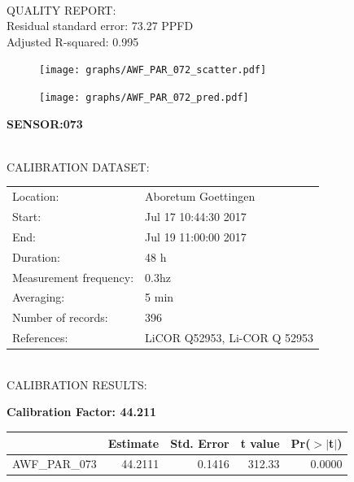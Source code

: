 \documentclass[oneside]{report}
\begin{document}
\hrulefill\\
QUALITY REPORT:\\
Residual standard error: 73.27 PPFD\\
Adjusted R-squared: 0.995



\begin{figure}[H]
  \centering
  \texttt{[image: graphs/AWF\_PAR\_072\_scatter.pdf]}
\end{figure}




\begin{figure}[H]
  \centering
  \texttt{[image: graphs/AWF\_PAR\_072\_pred.pdf]}
\end{figure}

\pagebreak


\begin{center}
\large{\textbf{SENSOR:073}}\\
\end{center}

\hrulefill\\
CALIBRATION DATASET:\\
\begin{table}[h!]
  \centering
  \label{tab:table1}
  \begin{tabular}{ll}
    Location: & Aboretum Goettingen\\ 
    
    
    Start:  & Jul 17 10:44:30 2017 \\
    End:   & Jul 19 11:00:00 2017\\ 
    Duration: & 48 h\\
    Measurement frequency: & 0.3hz\\
    Averaging:  &5 min\\
    Number of records: & 396 \\
    References: & LiCOR Q52953, Li-COR Q 52953 \\
  \end{tabular}
\end{table}

\hrulefill\\
CALIBRATION RESULTS:\\


\begin{center}
\textbf{\large{Calibration Factor: 44.211}}\\
\end{center}
\begin{table}[ht]
\centering
\begin{tabular}{rrrrr}
  \hline
 & Estimate & Std. Error & t value & Pr($>$$|$t$|$) \\ 
  \hline
AWF\_PAR\_073 & 44.2111 & 0.1416 & 312.33 & 0.0000 \\ 
   \hline
\end{tabular}
\end{table}
\end{document}
